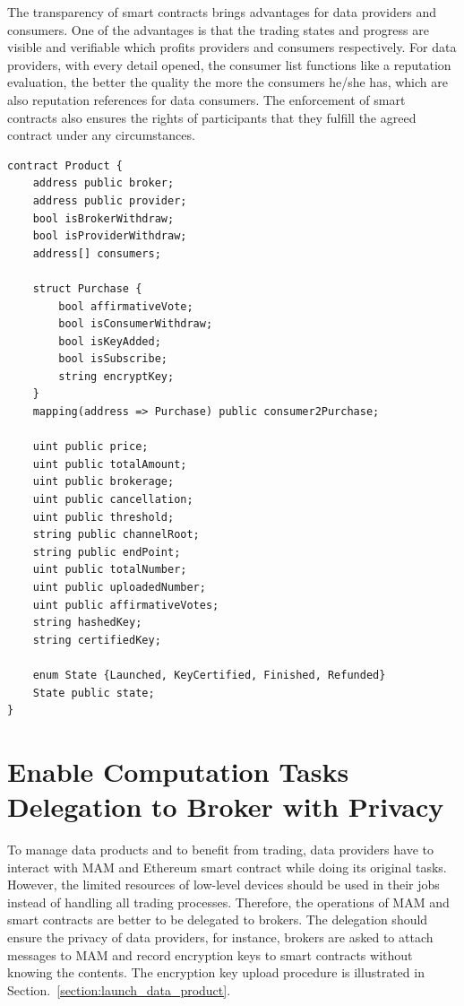 \begin{spacing}{2.0}
The transparency of smart contracts brings advantages for data providers and consumers. One of the advantages is that the trading states and progress are visible and verifiable which profits providers and consumers respectively. For data providers, with every detail opened, the consumer list functions like a reputation evaluation, the better the quality the more the consumers he/she has, which are also reputation references for data consumers. The enforcement of smart contracts also ensures the rights of participants that they fulfill the agreed contract under any circumstances.

\lstset{style=solidity}
\begin{lstlisting}[caption={Product Contract data fields}, label={lst:constructor}, frame=single]
contract Product {
    address public broker;
    address public provider;
    bool isBrokerWithdraw;
    bool isProviderWithdraw;
    address[] consumers;
    
    struct Purchase {
        bool affirmativeVote;
        bool isConsumerWithdraw;
        bool isKeyAdded;
        bool isSubscribe;
        string encryptKey;
    }
    mapping(address => Purchase) public consumer2Purchase;
    
    uint public price;
    uint public totalAmount;
    uint public brokerage;
    uint public cancellation;
    uint public threshold;
    string public channelRoot;
    string public endPoint;
    uint public totalNumber;
    uint public uploadedNumber;
    uint public affirmativeVotes;
    string hashedKey;
    string certifiedKey;
    
    enum State {Launched, KeyCertified, Finished, Refunded}
    State public state;
}
\end{lstlisting}
\clearpage

\section{Enable Computation Tasks Delegation to Broker with Privacy}
To manage data products and to benefit from trading, data providers have to interact with MAM and Ethereum smart contract while doing its original tasks. However, the limited resources of low-level devices should be used in their jobs instead of handling all trading processes. Therefore, the operations of MAM and smart contracts are better to be delegated to brokers. The delegation should ensure the privacy of data providers, for instance, brokers are asked to attach messages to MAM and record encryption keys to smart contracts without knowing the contents. The encryption key upload procedure is illustrated in Section.~\ref{section:launch_data_product}.


\end{spacing}
